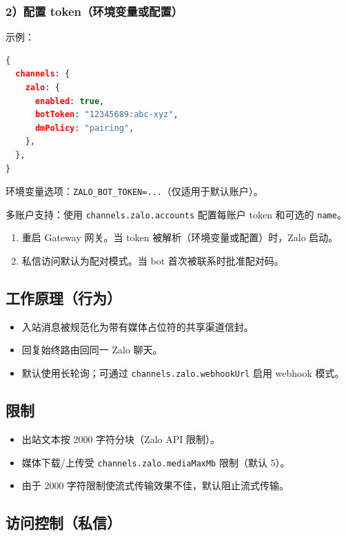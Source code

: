 \subsubsection{2）配置 token（环境变量或配置）}


示例：

\begin{lstlisting}[language=json]
{
  channels: {
    zalo: {
      enabled: true,
      botToken: "12345689:abc-xyz",
      dmPolicy: "pairing",
    },
  },
}
\end{lstlisting}


环境变量选项：\texttt{ZALO\_BOT\_TOKEN=...}（仅适用于默认账户）。

多账户支持：使用 \texttt{channels.zalo.accounts} 配置每账户 token 和可选的 \texttt{name}。

\begin{enumerate}
  \item 重启 Gateway 网关。当 token 被解析（环境变量或配置）时，Zalo 启动。
  \item 私信访问默认为配对模式。当 bot 首次被联系时批准配对码。
\end{enumerate}


\subsection{工作原理（行为）}


\begin{itemize}
  \item 入站消息被规范化为带有媒体占位符的共享渠道信封。
  \item 回复始终路由回同一 Zalo 聊天。
  \item 默认使用长轮询；可通过 \texttt{channels.zalo.webhookUrl} 启用 webhook 模式。
\end{itemize}


\subsection{限制}


\begin{itemize}
  \item 出站文本按 2000 字符分块（Zalo API 限制）。
  \item 媒体下载/上传受 \texttt{channels.zalo.mediaMaxMb} 限制（默认 5）。
  \item 由于 2000 字符限制使流式传输效果不佳，默认阻止流式传输。
\end{itemize}


\subsection{访问控制（私信）}


